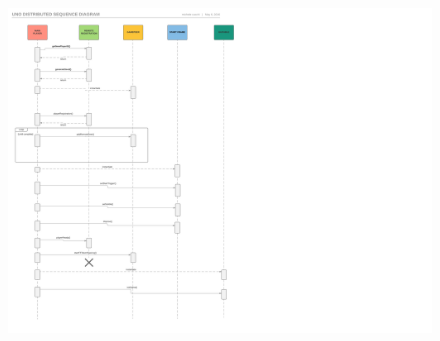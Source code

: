 \documentclass[10pt,a4paper]{article}
\begin{document}
\begin{figure}[H]
\begin{center}
\includegraphics[height=22cm, keepaspectratio]{registration.png}
\end{center}
\end{figure}
\end{document}
